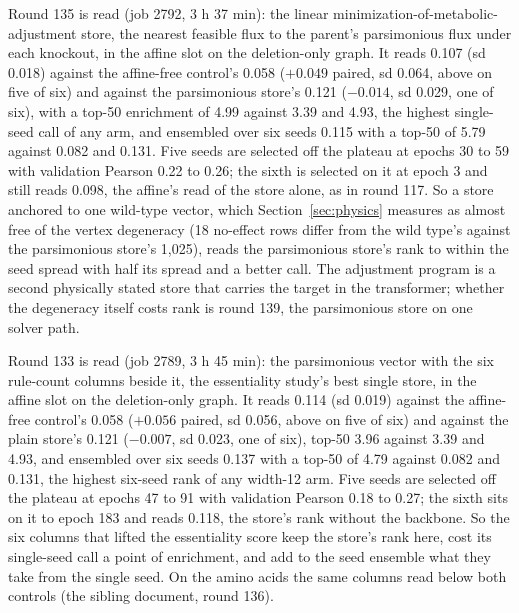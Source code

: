 Round 135 is read (job 2792, 3 h 37 min): the linear minimization-of-metabolic-adjustment
store, the nearest feasible flux to the parent's parsimonious flux under each knockout,
in the affine slot on the deletion-only graph. It reads 0.107 (sd 0.018) against the
affine-free control's 0.058 ($+0.049$ paired, sd 0.064, above on five of six) and
against the parsimonious store's 0.121 ($-0.014$, sd 0.029, one of six), with a top-50
enrichment of 4.99 against 3.39 and 4.93, the highest single-seed call of any arm, and
ensembled over six seeds 0.115 with a top-50 of 5.79 against 0.082 and 0.131. Five
seeds are selected off the plateau at epochs 30 to 59 with validation Pearson 0.22 to
0.26; the sixth is selected on it at epoch 3 and still reads 0.098, the affine's read of
the store alone, as in round 117. So a store anchored to one wild-type vector, which
Section~\ref{sec:physics} measures as almost free of the vertex degeneracy (18 no-effect
rows differ from the wild type's against the parsimonious store's 1,025), reads the
parsimonious store's rank to within the seed spread with half its spread and a better
call. The adjustment program is a second physically stated store that carries the
target in the transformer; whether the degeneracy itself costs rank is round 139, the
parsimonious store on one solver path.

Round 133 is read (job 2789, 3 h 45 min): the parsimonious vector with the six
rule-count columns beside it, the essentiality study's best single store, in the affine
slot on the deletion-only graph. It reads 0.114 (sd 0.019) against the affine-free
control's 0.058 ($+0.056$ paired, sd 0.056, above on five of six) and against the plain
store's 0.121 ($-0.007$, sd 0.023, one of six), top-50 3.96 against 3.39 and 4.93, and
ensembled over six seeds 0.137 with a top-50 of 4.79 against 0.082 and 0.131, the
highest six-seed rank of any width-12 arm. Five seeds are selected off the plateau at
epochs 47 to 91 with validation Pearson 0.18 to 0.27; the sixth sits on it to epoch 183
and reads 0.118, the store's rank without the backbone. So the six columns that lifted
the essentiality score keep the store's rank here, cost its single-seed call a point of
enrichment, and add to the seed ensemble what they take from the single seed. On the
amino acids the same columns read below both controls (the sibling document, round
136).

